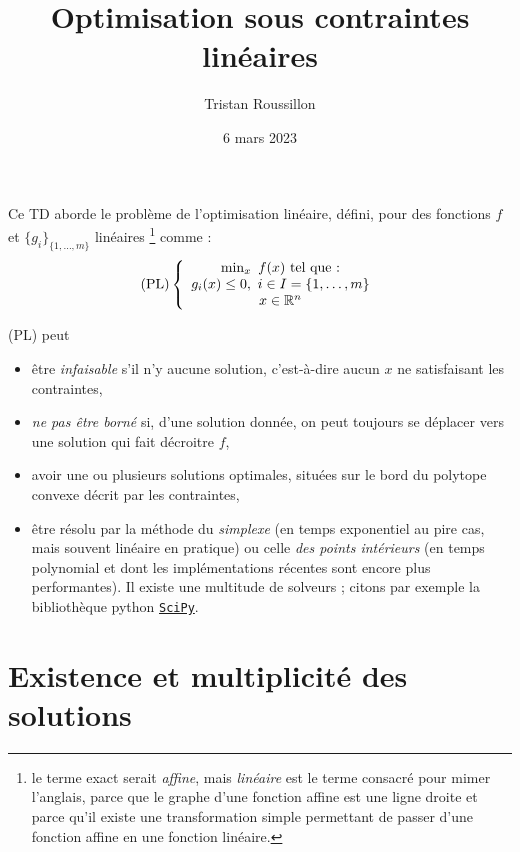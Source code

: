\documentclass[a4paper,francais]{article}
\title{Optimisation sous contraintes linéaires}
\author{Tristan Roussillon}
\date{6 mars 2023}
\newcommand{\R}{{\ensuremath\mathbb{R}}}
\theoremstyle{definition}
\begin{document}
\maketitle

Ce TD aborde le problème de l'optimisation linéaire, défini,
pour des fonctions $f$ et $\{g_i\}_{\{1, \dots, m\}}$ linéaires
\footnote{le terme exact serait \emph{affine}, mais \emph{linéaire}
  est le terme consacré pour mimer l'anglais, parce que le graphe
  d'une fonction affine est une ligne droite et parce qu'il
  existe une transformation simple permettant de passer d'une
  fonction affine en une fonction linéaire.}
comme :
\[
\text{(PL)} \left\{
\begin{array}{c}
  \min_{x} \ f(x) \ \text{tel que :} \\
  g_i(x) \leq 0, \ i \in I = \{1, \dots, m\} \\
  x \in  \R^n \\
\end{array}
\right.
\]

(PL) peut
\begin{itemize}
\item être \emph{infaisable} s'il n'y aucune solution,
  c'est-à-dire aucun $x$ ne satisfaisant les contraintes,
\item \emph{ne pas être borné} si, d'une solution donnée, on peut
  toujours se déplacer vers une solution qui fait décroitre $f$,
\item avoir une ou plusieurs solutions optimales, situées
  sur le bord du polytope convexe décrit par les contraintes,
\item être résolu par la méthode du \emph{simplexe}
  (en temps exponentiel au pire cas, mais souvent linéaire en
  pratique) ou celle \emph{des points intérieurs} (en temps
  polynomial et dont les implémentations récentes sont encore
  plus performantes). Il existe une multitude de solveurs ;
  citons par exemple la bibliothèque python
  \href{https://docs.scipy.org/doc/}{\texttt{SciPy}}.
\end{itemize} 

\section{Existence et multiplicité des solutions}
\label{sec:sol}
\end{document}
